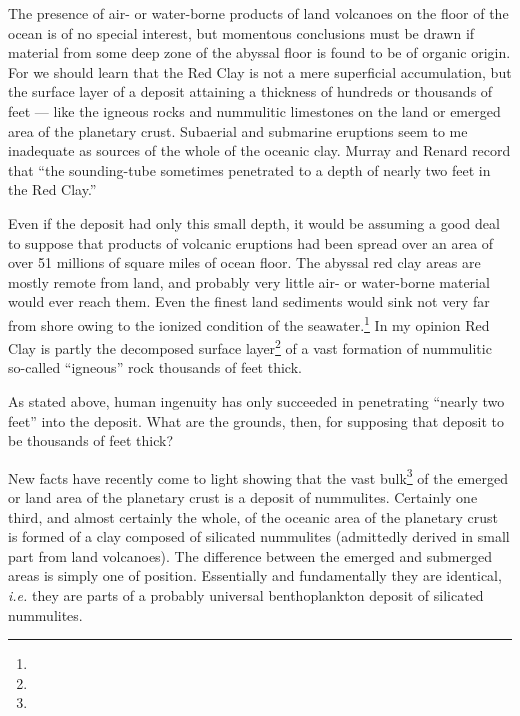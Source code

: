 \documentclass[a4paper, 12pt, oneside]{article}
\begin{document}
The presence of air- or water-borne products of land volcanoes on the floor of the ocean is of no special interest, but momentous conclusions must be drawn if material from some deep zone of the abyssal floor is found to be of organic origin. For we should learn that the Red Clay is not a mere superficial accumulation, but the surface layer of a deposit attaining a thickness of hundreds or thousands of feet --- like the igneous rocks and nummulitic limestones on the land or emerged area of the planetary crust. Subaerial and submarine eruptions seem to me inadequate as sources of the whole of the oceanic clay. Murray and Renard record that ``the sounding-tube sometimes penetrated to a depth of nearly two feet in the Red Clay.''

Even if the deposit had only this small depth, it would be assuming a good deal to suppose that products of volcanic eruptions had been spread over an area of over 51 millions of square miles of ocean floor. The abyssal red clay areas are mostly remote from land, and probably very little air- or water-borne material would ever reach them. Even the finest land sediments would sink not very far from shore owing to the ionized condition of the seawater.\footnote{} In my opinion Red Clay is partly the decomposed surface layer\footnote{} of a vast formation of nummulitic so-called ``igneous'' rock thousands of feet thick.

As stated above, human ingenuity has only succeeded in penetrating ``nearly two feet'' into the deposit. What are the grounds, then, for supposing that deposit to be thousands of feet thick?

New facts have recently come to light showing that the vast bulk\footnote{} of the emerged or land area of the planetary crust is a deposit of nummulites. Certainly one third, and almost certainly the whole, of the oceanic area of the planetary crust is formed of a clay composed of silicated nummulites (admittedly derived in small part from land volcanoes). The difference between the emerged and submerged areas is simply one of position. Essentially and fundamentally they are identical, \emph{i.e.} they are parts of a probably universal benthoplankton deposit of silicated nummulites.
\end{document}
